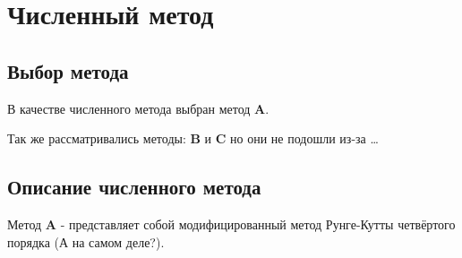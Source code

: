 \chapter{Численный метод}\label{ch:numeric}

\section*{Выбор метода}
В качестве численного метода выбран метод \textbf{A}.

Так же рассматривались методы: \textbf{B} и \textbf{C} но они не подошли из-за \ldots

\section*{Описание численного метода}
Метод \textbf{A} - представляет собой модифицированный метод Рунге-Кутты четвёртого порядка (А на самом деле?).